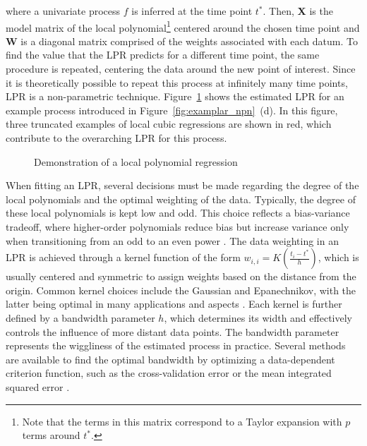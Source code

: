 \documentclass[jou, floatsintext]{apa7}
\begin{document}
\noindent where a univariate process $f$ is inferred at the time point $t^*$.
Then, \textbf{X} is the model matrix of the local polynomial\footnote{Note
  that the terms in this matrix correspond to a Taylor expansion with $p$ terms
  around $t^*$.} centered around the chosen time point and \textbf{W} is a
diagonal matrix comprised of the weights associated with each datum. To find
the value that the LPR predicts for a different time point, the same procedure
is repeated, centering the data around the new point of interest. Since it is
theoretically possible to repeat this process at infinitely many time points,
LPR is a non-parametric technique. Figure~\ref{fig:locpol_dem} shows the
estimated LPR for an example process introduced in
Figure~\ref{fig:examplar_npn}~(d). In this figure, three truncated examples of
local cubic regressions are shown in red, which contribute to the overarching
LPR for this process.\@

\begin{figure}[!ht]
  \caption{Demonstration of a local polynomial regression}
  \label{fig:locpol_dem}
\end{figure}

When fitting an LPR, several decisions must be made regarding the degree of the
local polynomials and the optimal weighting of the data. Typically, the degree
of these local polynomials is kept low and odd. This choice reflects a
bias-variance tradeoff, where higher-order polynomials reduce bias but increase
variance only when transitioning from an odd to an even power
\parencite{ruppert_multivariate_1994}. The data weighting in an LPR is achieved
through a kernel function of the form $w_{i, i} = K(\frac{t_i - t^*}{h})$,
which is usually centered and symmetric to assign weights based on the distance
from the origin. Common kernel choices include the Gaussian and Epanechnikov,
with the latter being optimal in many applications and aspects
\parencite{fan_local_1997}. Each kernel is further defined by a bandwidth
parameter $h$, which determines its width and effectively controls the
influence of more distant data points. The bandwidth parameter represents the
wiggliness of the estimated process in practice. Several methods are available
to find the optimal bandwidth by optimizing a data-dependent criterion
function, such as the cross-validation error or the mean integrated squared
error \parencite{kohler_review_2014, debruyne_model_2008}.
\end{document}
